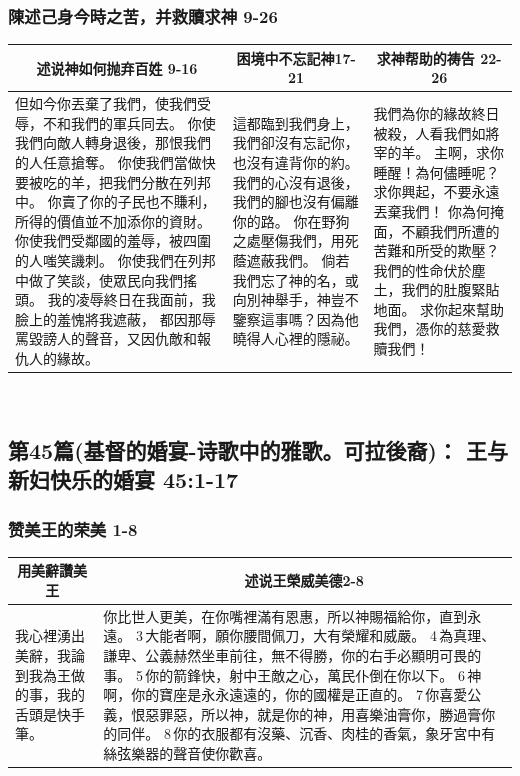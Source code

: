 \subsubsection{陳述己身今時之苦，并救贖求神 9-26}
\begin{table}[H]
\centering
\begin{tabular}{p{7.5cm}|p{4.25cm}|p{4.500cm}}\hline\hline
\multicolumn{1}{c|}{述说神如何抛弃百姓 9-16}&\multicolumn{1}{c|}{困境中不忘記神17-21}&\multicolumn{1}{c}{求神帮助的祷告 22-26}\\\hline
但如今你丟棄了我們，使我們受辱，不和我們的軍兵同去。
你使我們向敵人轉身退後，那恨我們的人任意搶奪。
你使我們當做快要被吃的羊，把我們分散在列邦中。
你賣了你的子民也不賺利，所得的價值並不加添你的資財。
你使我們受鄰國的羞辱，被四圍的人嗤笑譏刺。
你使我們在列邦中做了笑談，使眾民向我們搖頭。
我的凌辱終日在我面前，我臉上的羞愧將我遮蔽，
都因那辱罵毀謗人的聲音，又因仇敵和報仇人的緣故。
&這都臨到我們身上，我們卻沒有忘記你，也沒有違背你的約。
我們的心沒有退後，我們的腳也沒有偏離你的路。
你在野狗之處壓傷我們，用死蔭遮蔽我們。
倘若我們忘了神的名，或向別神舉手，神豈不鑒察這事嗎？因為他曉得人心裡的隱祕。
&我們為你的緣故終日被殺，人看我們如將宰的羊。
主啊，求你睡醒！為何儘睡呢？求你興起，不要永遠丟棄我們！
你為何掩面，不顧我們所遭的苦難和所受的欺壓？
我們的性命伏於塵土，我們的肚腹緊貼地面。
求你起來幫助我們，憑你的慈愛救贖我們！\\\hline
\end{tabular}
\end{table} 



\subsection{第45篇(基督的婚宴-诗歌中的雅歌。可拉後裔)： 王与新妇快乐的婚宴 45:1-17}
\subsubsection{赞美王的荣美 1-8}
\begin{table}[H]
\centering
\begin{tabular}{p{2.25cm}|p{}}\hline\hline
\multicolumn{1}{c|}{用美辭讚美王}&\multicolumn{1}{c}{述说王榮威美德2-8}\\\hline
我心裡湧出美辭，我論到我為王做的事，我的舌頭是快手筆。
&你比世人更美，在你嘴裡滿有恩惠，所以神賜福給你，直到永遠。
3 大能者啊，願你腰間佩刀，大有榮耀和威嚴。
4 為真理、謙卑、公義赫然坐車前往，無不得勝，你的右手必顯明可畏的事。
5 你的箭鋒快，射中王敵之心，萬民仆倒在你以下。
6 神啊，你的寶座是永永遠遠的，你的國權是正直的。
7 你喜愛公義，恨惡罪惡，所以神，就是你的神，用喜樂油膏你，勝過膏你的同伴。
8 你的衣服都有沒藥、沉香、肉桂的香氣，象牙宮中有絲弦樂器的聲音使你歡喜。\\\hline
\end{tabular}
\end{table} 

